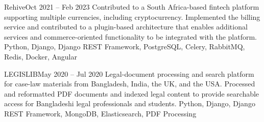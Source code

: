 %
%
%


\begin{projects}

    \project
        {Rehive}{Oct 2021 -- Feb 2023}
        {}
        {Contributed to a South Africa-based fintech platform supporting multiple
        currencies, including cryptocurrency. Implemented the billing service and
        contributed to a plugin-based architecture that enables additional services
        and commerce-oriented functionality to be integrated with the platform.}
        {Python, Django, Django REST Framework, PostgreSQL, Celery, RabbitMQ,
        Redis, Docker, Angular}

    \project
        {LEGISLIB}{May 2020 -- Jul 2020}
        {}
        {Legal-document processing and search platform for case-law materials from
        Bangladesh, India, the UK, and the USA. Processed and reformatted PDF
        documents and indexed legal content to provide searchable access for
        Bangladeshi legal professionals and students.}
        {Python, Django, Django REST Framework, MongoDB, Elasticsearch,
        PDF Processing}

\end{projects}

